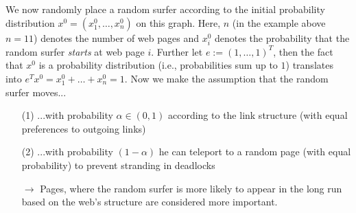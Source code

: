 {\begin{center}
\begin{minipage}[c]{0.5\textwidth}
	\end{minipage}
\end{center}

We now randomly place a random surfer according to the initial probability distribution $x^0 = (x^0_1, \ldots, x_n^0)$ on this graph. Here, $n$ (in the example above $n=11$) denotes the number of web pages and $x^0_i$ denotes the probability that the random surfer \textit{starts} at web page $i$. Further let $e := (1,\ldots,1)^T$, then the fact that $x^0$ is a probability distribution (i.e., probabilities sum up to $1$) translates into $e^Tx^0 =x^0_1+\ldots+x_n^0 =1$. Now we make the assumption that the random surfer moves...
\begin{itemize}
	\item[(1)] ...with probability $\alpha \in (0,1)$ according to the link structure (with equal preferences to outgoing links)
	\item[(2)] ...with probability $(1-\alpha)$ he can teleport to a random page (with equal probability) to prevent stranding in deadlocks
	\item[$\rightarrow$] Pages, where the random surfer is more likely to appear in the long run based on the web's structure are considered more important. 
\end{itemize}

}
